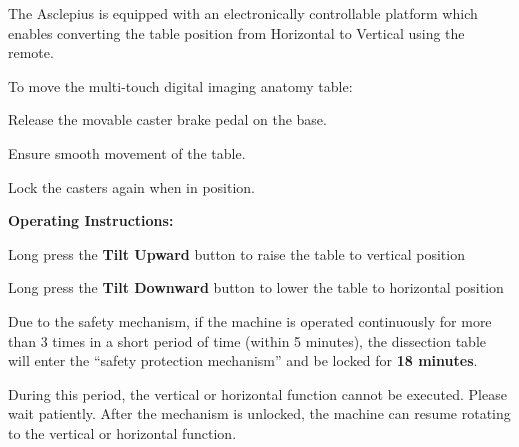 \documentclass[11pt,a4paper]{article}
\begin{document}
The Asclepius is equipped with an electronically controllable platform which
enables converting the table position from Horizontal to Vertical using the remote.


To move the multi-touch digital imaging anatomy table:

\begin{tbkSteps}
  \item Release the movable caster brake pedal on the base.
  \item Ensure smooth movement of the table.
  \item Lock the casters again when in position.
\end{tbkSteps}



\textbf{Operating Instructions:}

\begin{tbkList}
  \item Long press the \textbf{Tilt Upward} button to raise the table to vertical position
  \item Long press the \textbf{Tilt Downward} button to lower the table to horizontal position
\end{tbkList}


\begin{tbkCallout}[type=notice, title=Safety Protection Mechanism]
  Due to the safety mechanism, if the machine is operated continuously for more
  than 3 times in a short period of time (within 5 minutes), the dissection table
  will enter the ``safety protection mechanism'' and be locked for \textbf{18 minutes}.

  During this period, the vertical or horizontal function cannot be executed.
  Please wait patiently. After the mechanism is unlocked, the machine can resume
  rotating to the vertical or horizontal function.
\end{tbkCallout}
\end{document}

